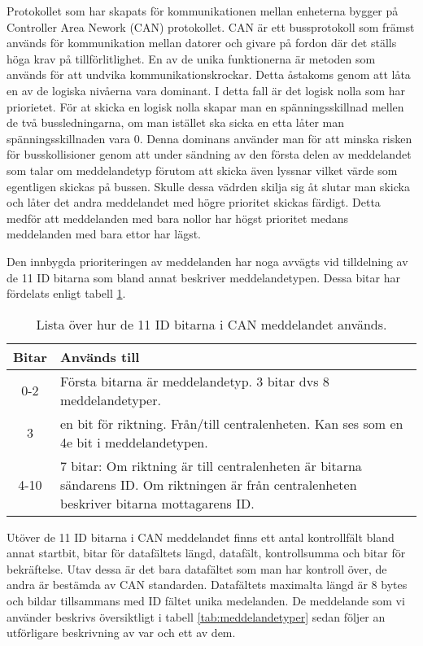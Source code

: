 Protokollet som har skapats för kommunikationen mellan enheterna bygger på Controller Area Nework (CAN) protokollet. CAN är ett bussprotokoll som främst används för kommunikation mellan datorer och givare på fordon där det ställs höga krav på tillförlitlighet. En av de unika funktionerna är metoden som används för att undvika kommunikationskrockar. Detta åstakoms genom att låta en av de logiska nivåerna vara dominant. I detta fall är det logisk nolla som har priorietet. För at skicka en logisk nolla skapar man en spänningsskillnad mellen de två bussledningarna, om man istället ska sicka en etta låter man spänningsskillnaden vara 0. Denna dominans använder man för att minska risken för busskollisioner genom att under sändning av den första delen av meddelandet som talar om meddelandetyp förutom att skicka även lyssnar vilket värde som egentligen skickas på bussen. Skulle dessa vädrden skilja sig åt slutar man skicka och låter det andra meddelandet med högre prioritet skickas färdigt. Detta medför att meddelanden med bara nollor har högst prioritet medans meddelanden med bara ettor har lägst.

Den innbygda prioriteringen av meddelanden har noga avvägts vid tilldelning av de 11 ID bitarna som bland annat beskriver meddelandetypen. Dessa bitar har fördelats enligt tabell \ref{tab:idbitar}.

\begin{table}[H]
	\centering
	\begin{tabular}{|c|p{}|}
		\hline
		Bitar 	& Används till \\ \hline \hline
		0-2		& Första bitarna är meddelandetyp. 3 bitar dvs 8 meddelandetyper. \\ \hline
		3		& en bit för riktning. Från/till centralenheten. Kan ses som en 4e bit i meddelandetypen. \\ \hline
		4-10	& 7 bitar:
		Om riktning är till centralenheten är bitarna sändarens ID.
		Om riktningen är från centralenheten beskriver bitarna mottagarens ID. \\ \hline

	\end{tabular}
	\caption{Lista över hur de 11 ID bitarna i CAN meddelandet används.}
	\label{tab:idbitar}
\end{table}

Utöver de 11 ID bitarna i CAN meddelandet finns ett antal kontrollfält bland annat startbit, bitar för datafältets längd, datafält, kontrollsumma och bitar för bekräftelse. Utav dessa är det bara datafältet som man har kontroll över, de andra är bestämda av CAN standarden. Datafältets maximalta längd är 8 bytes och bildar tillsammans med ID fältet unika medelanden. De meddelande som vi använder beskrivs översiktligt i tabell \ref{tab:meddelandetyper} sedan följer an utförligare beskrivning av var och ett av dem.

